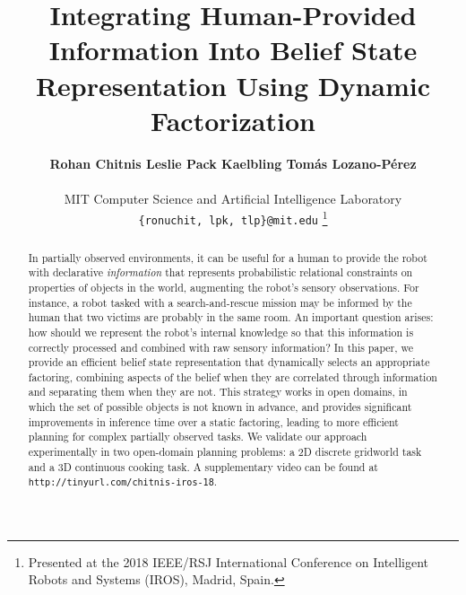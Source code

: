 \documentclass[letterpaper, 10 pt, conference]{ieeeconf}  %
\title{\LARGE \bf Integrating Human-Provided Information Into Belief State Representation Using Dynamic Factorization}
\author{
  \textbf{Rohan Chitnis \hspace{16mm} Leslie Pack Kaelbling \hspace{8mm} Tom\'as Lozano-P\'erez}\\\\
  MIT Computer Science and Artificial Intelligence Laboratory\\
  \texttt{\{ronuchit, lpk, tlp\}@mit.edu}
  \thanks{\hspace*{-1em}Presented at the 2018 IEEE/RSJ International Conference on Intelligent Robots and Systems (IROS), Madrid, Spain.}
}
\begin{document}


\maketitle
\thispagestyle{empty}
\pagestyle{empty}
\setlength{\textfloatsep}{8pt}%


\begin{abstract}
  In partially observed environments, it can be useful for a human to
  provide the robot with declarative \emph{information} that
  represents probabilistic relational constraints on properties of
  objects in the world, augmenting the robot's sensory
  observations. For instance, a robot tasked with a search-and-rescue
  mission may be informed by the human that two victims are probably
  in the same room. An important question arises: how should we
  represent the robot's internal knowledge so that this information is
  correctly processed and combined with raw sensory information? In
  this paper, we provide an efficient belief state representation that
  dynamically selects an appropriate factoring, combining aspects of
  the belief when they are correlated through information and
  separating them when they are not. This strategy works in open
  domains, in which the set of possible objects is not known in
  advance, and provides significant improvements in inference time
  over a static factoring, leading to more efficient planning for
  complex partially observed tasks. We validate our approach
  experimentally in two open-domain planning problems: a 2D discrete
  gridworld task and a 3D continuous cooking task. A supplementary
  video can be found at \texttt{http://tinyurl.com/chitnis-iros-18}.
\end{abstract}









\end{document}
